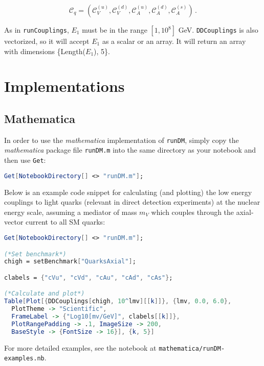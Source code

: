 \documentclass[notitlepage,12pt]{article}
\begin{document}
\begin{equation}
\mathcal{C}_q = \left( \mathcal{C}_V^{(u)}, \mathcal{C}_V^{(d)}, \mathcal{C}_A^{(u)}, \mathcal{C}_A^{(d)}, \mathcal{C}_A^{(s)} \right)\,.
\end{equation}

As in \texttt{runCouplings}, $E_1$ must be in the range $[1, 10^8]$ GeV. \texttt{DDCouplings} is also vectorized, so it will accept $E_1$ as a scalar or an array. It will return an array with dimensions \{Length($E_1$), 5\}.

\section{Implementations}
\label{sec:implementations}

\subsection{Mathematica}

In order to use the \textit{mathematica} implementation of \texttt{runDM}, simply copy the \textit{mathematica} package file \texttt{runDM.m} into the same directory as your notebook and then use \texttt{Get}:

\begin{lstlisting}[language=mathematica]
Get[NotebookDirectory[] <> "runDM.m"];
\end{lstlisting}

Below is an example code snippet for calculating (and plotting) the low energy couplings to light quarks (relevant in direct detection experiments) at the nuclear energy scale, assuming a mediator of mass $m_V$ which couples through the axial-vector current to all SM quarks:

\begin{lstlisting}[language=mathematica]
Get[NotebookDirectory[] <> "runDM.m"];

(*Set benchmark*)
chigh = setBenchmark["QuarksAxial"];

clabels = {"cVu", "cVd", "cAu", "cAd", "cAs"};

(*Calculate and plot*)
Table[Plot[{DDCouplings[chigh, 10^lmv][[k]]}, {lmv, 0.0, 6.0}, 
  PlotTheme -> "Scientific", 
  FrameLabel -> {"Log10[mv/GeV]", clabels[[k]]}, 
  PlotRangePadding -> .1, ImageSize -> 200, 
  BaseStyle -> {FontSize -> 16}], {k, 5}]
\end{lstlisting}
For more detailed examples, see the notebook at \texttt{mathematica/runDM-examples.nb}.
\end{document}
